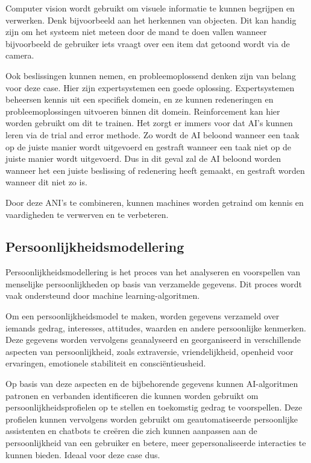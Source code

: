 Computer vision wordt gebruikt om visuele informatie te kunnen begrijpen en verwerken. Denk bijvoorbeeld aan het herkennen van objecten. Dit kan handig zijn om het systeem niet meteen door de mand te doen vallen wanneer bijvoorbeeld de gebruiker iets vraagt over een item dat getoond wordt via de camera. 

Ook beslissingen kunnen nemen, en probleemoplossend denken zijn van belang voor deze case. Hier zijn expertsystemen een goede oplossing. Expertsystemen beheersen kennis uit een specifiek domein, en ze kunnen redeneringen en probleemoplossingen uitvoeren binnen dit domein. Reinforcement kan hier worden gebruikt om dit te trainen. Het zorgt er immers voor dat AI's kunnen leren via de trial and error methode. Zo wordt de AI beloond wanneer een taak op de juiste manier wordt uitgevoerd en gestraft wanneer een taak niet op de juiste manier wordt uitgevoerd. Dus in dit geval zal de AI beloond worden wanneer het een juiste beslissing of redenering heeft gemaakt, en gestraft worden wanneer dit niet zo is.

Door deze ANI's te combineren, kunnen machines worden getraind om kennis en vaardigheden te verwerven en te verbeteren.

\subsection{Persoonlijkheidsmodellering}

Persoonlijkheidsmodellering is het proces van het analyseren en voorspellen van menselijke persoonlijkheden op basis van verzamelde gegevens. Dit proces wordt vaak ondersteund door machine learning-algoritmen.

Om een persoonlijkheidsmodel te maken, worden gegevens verzameld over iemands gedrag, interesses, attitudes, waarden en andere persoonlijke kenmerken. Deze gegevens worden vervolgens geanalyseerd en georganiseerd in verschillende aspecten van persoonlijkheid, zoals extraversie, vriendelijkheid, openheid voor ervaringen, emotionele stabiliteit en consciëntieusheid.

Op basis van deze aspecten en de bijbehorende gegevens kunnen AI-algoritmen patronen en verbanden identificeren die kunnen worden gebruikt om persoonlijkheidsprofielen op te stellen en toekomstig gedrag te voorspellen. Deze profielen kunnen vervolgens worden gebruikt om geautomatiseerde persoonlijke assistenten en chatbots te creëren die zich kunnen aanpassen aan de persoonlijkheid van een gebruiker en betere, meer gepersonaliseerde interacties te kunnen bieden. Ideaal voor deze case dus.

